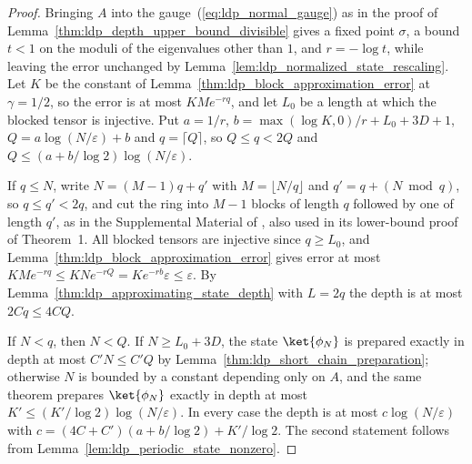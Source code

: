 \begin{proof}
    \leanok
    Bringing $A$ into the gauge~(\ref{eq:ldp_normal_gauge}) as in the proof of
    Lemma~\ref{thm:ldp_depth_upper_bound_divisible} gives a fixed point $\sigma$,
    a bound $t<1$ on the moduli of the eigenvalues other than $1$, and
    $r=-\log t$, while leaving the error unchanged by
    Lemma~\ref{lem:ldp_normalized_state_rescaling}. Let $K$ be the constant of
    Lemma~\ref{thm:ldp_block_approximation_error} at $\gamma=1/2$, so the error
    is at most $KMe^{-rq}$, and let $L_0$ be a length at which the blocked
    tensor is injective. Put $a=1/r$, $b=\max(\log K,0)/r+L_0+3D+1$,
    $Q=a\log(N/\varepsilon)+b$ and $q=\lceil Q\rceil$, so $Q\le q<2Q$ and
    $Q\le(a+b/\log2)\log(N/\varepsilon)$.

    If $q\le N$, write $N=(M-1)q+q'$ with $M=\lfloor N/q\rfloor$ and
    $q'=q+(N\bmod q)$, so $q\le q'<2q$, and cut the ring into $M-1$ blocks of
    length $q$ followed by one of length $q'$, as in the Supplemental Material
    of \cite{Malz2024Preparation}, also used in its lower-bound proof of
    Theorem~1. All blocked tensors are
    injective since $q\ge L_0$, and
    Lemma~\ref{thm:ldp_block_approximation_error} gives error at most
    $KMe^{-rq}\le KNe^{-rQ}=Ke^{-rb}\varepsilon\le\varepsilon$. By
    Lemma~\ref{thm:ldp_approximating_state_depth} with $L=2q$ the depth is at
    most $2Cq\le4CQ$.

    If $N<q$, then $N<Q$. If $N\ge L_0+3D$, the state $\ket{\phi_N}$ is prepared
    exactly in depth at most $C'N\le C'Q$ by
    Lemma~\ref{thm:ldp_short_chain_preparation}; otherwise $N$ is bounded by a
    constant depending only on $A$, and the same theorem prepares $\ket{\phi_N}$
    exactly in depth at most $K'\le(K'/\log2)\log(N/\varepsilon)$. In every case
    the depth is at most
    $c\log(N/\varepsilon)$ with $c=(4C+C')(a+b/\log2)+K'/\log2$. The second
    statement follows from Lemma~\ref{lem:ldp_periodic_state_nonzero}.
\end{proof}

